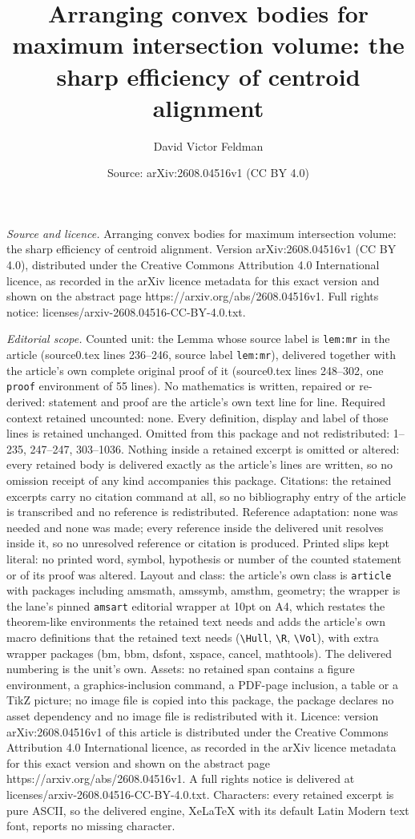 \documentclass[10pt,a4paper]{amsart}
\title[Arranging convex bodies for maximum intersection volume: the]{Arranging convex bodies for maximum intersection volume: the sharp efficiency of centroid alignment}
\author{David Victor Feldman}
\date{Source: arXiv:2608.04516v1 (CC BY 4.0)}
\begin{document}
\maketitle

\noindent\emph{Source and licence.} Arranging convex bodies for maximum intersection volume: the sharp efficiency of centroid alignment. Version arXiv:2608.04516v1 (CC BY 4.0), distributed under the Creative Commons Attribution 4.0 International licence, as recorded in the arXiv licence metadata for this exact version and shown on the abstract page https://arxiv.org/abs/2608.04516v1. Full rights notice: licenses/arxiv-2608.04516-CC-BY-4.0.txt.\par\smallskip

\noindent\textit{Editorial scope.} Counted unit: the Lemma whose source label is \texttt{lem:mr} in the article (source0.tex lines 236--246, source label \texttt{lem:mr}), delivered together with the article's own complete original proof of it (source0.tex lines 248--302, one \texttt{proof} environment of 55 lines). No mathematics is written, repaired or re-derived: statement and proof are the article's own text line for line. Required context retained uncounted: none. Every definition, display and label of those lines is retained unchanged. Omitted from this package and not redistributed: 1--235, 247--247, 303--1036. Nothing inside a retained excerpt is omitted or altered: every retained body is delivered exactly as the article's lines are written, so no omission receipt of any kind accompanies this package. Citations: the retained excerpts carry no citation command at all, so no bibliography entry of the article is transcribed and no reference is redistributed. Reference adaptation: none was needed and none was made; every reference inside the delivered unit resolves inside it, so no unresolved reference or citation is produced. Printed slips kept literal: no printed word, symbol, hypothesis or number of the counted statement or of its proof was altered. Layout and class: the article's own class is \texttt{article} with packages including amsmath, amssymb, amsthm, geometry; the wrapper is the lane's pinned \texttt{amsart} editorial wrapper at 10pt on A4, which restates the theorem-like environments the retained text needs and adds the article's own macro definitions that the retained text needs (\texttt{\textbackslash Hull}, \texttt{\textbackslash R}, \texttt{\textbackslash Vol}), with extra wrapper packages (bm, bbm, dsfont, xspace, cancel, mathtools). The delivered numbering is the unit's own. Assets: no retained span contains a figure environment, a graphics-inclusion command, a PDF-page inclusion, a table or a TikZ picture; no image file is copied into this package, the package declares no asset dependency and no image file is redistributed with it. Licence: version arXiv:2608.04516v1 of this article is distributed under the Creative Commons Attribution 4.0 International licence, as recorded in the arXiv licence metadata for this exact version and shown on the abstract page https://arxiv.org/abs/2608.04516v1. A full rights notice is delivered at licenses/arxiv-2608.04516-CC-BY-4.0.txt. Characters: every retained excerpt is pure ASCII, so the delivered engine, XeLaTeX with its default Latin Modern text font, reports no missing character.
\end{document}
